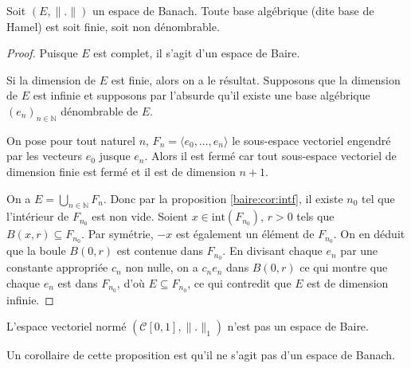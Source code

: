 \begin{prop}\label{baire:base}
  Soit $(E, \|.\|)$ un espace de Banach. Toute base algébrique
  (dite base de Hamel) est soit finie, soit non dénombrable.
\end{prop}

\begin{proof}
  Puisque $E$ est complet, il s'agit d'un espace de Baire.

  Si la dimension de $E$ est finie, alors on a le résultat.
  Supposons que la dimension de $E$ est infinie et supposons
  par l'absurde qu'il existe une base algébrique $(e_n)_{n\in\mathbb N}$
  dénombrable de $E$.

  On pose pour tout naturel $n$, $F_n = \langle e_0, \ldots, e_n\rangle$ le
  sous-espace vectoriel engendré par les vecteurs $e_0$ jusque $e_n$.
  Alors il est fermé car tout sous-espace vectoriel de dimension finie
  est fermé et il est de dimension $n+1$.

  On a $E = \bigcup_{n\in\mathbb N} F_n$. Donc par la proposition
  \ref{baire:cor:intf}, il existe $n_0$ tel que l'intérieur de
  $F_{n_0}$ est non vide. Soient $x\in \mathrm{int}(F_{n_0})$, $r > 0$
  tels que $B(x, r)\subseteq F_{n_0}$. Par symétrie, $-x$
  est également un élément de $F_{n_0}$. On en déduit que la boule
  $B(0, r)$ est contenue dans $F_{n_0}$. En divisant chaque $e_n$
  par une constante appropriée $c_n$ non nulle, on a $c_n e_n$
  dans $B(0, r)$ ce qui montre que chaque $e_n$ est dans $F_{n_0}$,
  d'où $E \subseteq F_{n_0}$, ce qui contredit que $E$ est de dimension infinie.
\end{proof}

\begin{prop}
  L'espace vectoriel normé $(\mathscr{C}[0, 1], \|.\|_1)$ n'est pas un
  espace de Baire.
\end{prop}
Un corollaire de cette proposition est qu'il ne s'agit pas d'un espace de
Banach.


